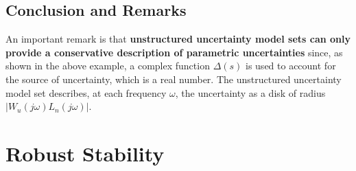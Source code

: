 \documentclass{article}
\numberwithin{equation}{subsection}
\begin{document}
	\subsection{Conclusion and Remarks}
	An important remark is that \textbf{unstructured uncertainty model sets can only provide a conservative description of parametric uncertainties} since, as shown in the above example, a complex function $\Delta(s)$ is used to account for the source of uncertainty, which is a real number.
	The unstructured uncertainty model set describes, at each frequency $\omega$, the uncertainty as a disk of radius $\left| W_u(j\omega)L_n(j\omega) \right|$.
	
	\section{Robust Stability}
	
	
	
\end{document}
